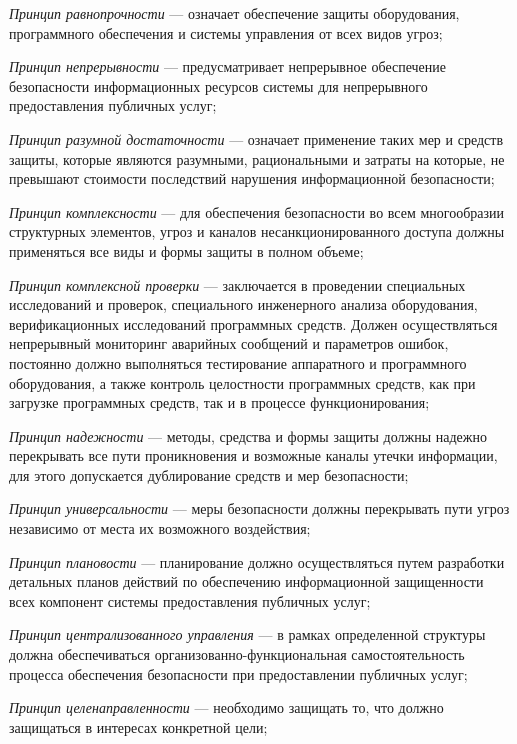 \begin{textitemize}
	\item \textit{Принцип равнопрочности} --- означает обеспечение защиты оборудования, программного обеспечения и системы управления от всех видов угроз;
	\item \textit{Принцип непрерывности} --- предусматривает непрерывное обеспечение безопасности информационных ресурсов системы для непрерывного предоставления публичных услуг;
	\item \textit{Принцип разумной достаточности} --- означает применение таких мер и средств защиты, которые являются разумными, рациональными и затраты на которые, не превышают стоимости последствий нарушения информационной безопасности;
	\item \textit{Принцип комплексности} --- для обеспечения безопасности во всем многообразии структурных элементов, угроз и каналов несанкционированного доступа должны применяться все виды и формы защиты в полном объеме;
	\item \textit{Принцип комплексной проверки} --- заключается в проведении специальных исследований и проверок, специального инженерного анализа оборудования, верификационных исследований программных средств. Должен осуществляться непрерывный мониторинг аварийных сообщений и параметров ошибок, постоянно должно выполняться тестирование аппаратного и программного оборудования, а также контроль целостности программных средств, как при загрузке программных средств, так и в процессе функционирования;
	\item \textit{Принцип надежности} --- методы, средства и формы защиты должны надежно перекрывать все пути проникновения и возможные каналы утечки информации, для этого допускается дублирование средств и мер безопасности;
	\item \textit{Принцип универсальности} --- меры безопасности должны перекрывать пути угроз независимо от места их возможного воздействия;
	\item \textit{Принцип плановости} --- планирование должно осуществляться путем разработки детальных планов действий по обеспечению информационной защищенности всех компонент системы предоставления публичных услуг;
	\item \textit{Принцип централизованного управления} --- в рамках определенной структуры должна обеспечиваться организованно-функциональная самостоятельность процесса обеспечения безопасности при предоставлении публичных услуг;
	\item \textit{Принцип целенаправленности} --- необходимо защищать то, что должно защищаться в интересах конкретной цели;

\end{textitemize}
